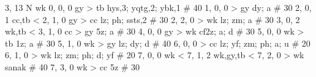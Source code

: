 %
3, 13 %
N %
wk
%
0, 0, 0
gy > tb
hys,3; yqtg,2; ybk,1 # 40
%
1, 0, 0
 > gy
dy; a # 30
%
2, 0, 1
cc,tb < 
%
2, 1, 0
gy > cc
lz; ph; ssts,2 # 30
%
2, 2, 0
 > wk
lz; zm; a # 30
%
3, 0, 2
wk,tb < 
%
3, 1, 0
cc > gy
5z; a # 30
%
4, 0, 0
gy > wk
cf2z; a; d # 30
%
5, 0, 0
wk > tb
1z; a # 30
%
5, 1, 0
wk > gy
lz; dy; d # 40
%
6, 0, 0
 > cc
lz; yf; zm; ph; a; u # 20
%
6, 1, 0
 > wk
lz; zm; ph; d; yf # 20
%
7, 0, 0
wk < 
%
7, 1, 2
wk,gy,tb < 
%
7, 2, 0
 > wk
sanak # 40
%
7, 3, 0
wk > cc
5z # 30